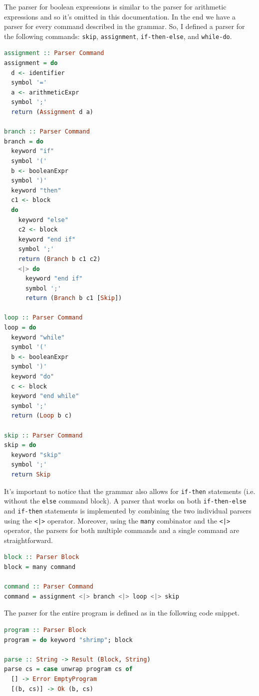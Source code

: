 \documentclass[12pt,a4paper]{article}
\begin{document}
The parser for boolean expressions is similar to the parser for arithmetic expressions and so it's omitted in this documentation. In the end we have a parser for every command described in the grammar.
So, I defined a parser for the following commands: \texttt{skip}, \texttt{assignment}, \texttt{if-then-else}, and \texttt{while-do}.
\begin{lstlisting}[language=Haskell, style=custom-style]
assignment :: Parser Command
assignment = do
  d <- identifier
  symbol '='
  a <- arithmeticExpr
  symbol ';'
  return (Assignment d a)

branch :: Parser Command
branch = do
  keyword "if"
  symbol '('
  b <- booleanExpr
  symbol ')'
  keyword "then"
  c1 <- block
  do
    keyword "else"
    c2 <- block
    keyword "end if"
    symbol ';'
    return (Branch b c1 c2)
    <|> do
      keyword "end if"
      symbol ';'
      return (Branch b c1 [Skip])

loop :: Parser Command
loop = do
  keyword "while"
  symbol '('
  b <- booleanExpr
  symbol ')'
  keyword "do"
  c <- block
  keyword "end while"
  symbol ';'
  return (Loop b c)

skip :: Parser Command
skip = do
  keyword "skip"
  symbol ';'
  return Skip
\end{lstlisting}
It's important to notice that the grammar also allows for \texttt{if-then} statements (i.e. without the \texttt{else} command block).
A parser that works on both \texttt{if-then-else} and \texttt{if-then} statements is implemented by combining the two individual parsers using the \texttt{<|>} operator.
Moreover, using the \texttt{many} combinator and the \texttt{<|>} operator, the parsers for both multiple commands and a single command are straightforward.
\begin{lstlisting}[language=Haskell, style=custom-style]
block :: Parser Block
block = many command

command :: Parser Command
command = assignment <|> branch <|> loop <|> skip
\end{lstlisting}
The parser for the entire program is defined as in the following code snippet.
\begin{lstlisting}[language=Haskell, style=custom-style]
program :: Parser Block
program = do keyword "shrimp"; block

parse :: String -> Result (Block, String)
parse cs = case unwrap program cs of
  [] -> Error EmptyProgram
  [(b, cs)] -> Ok (b, cs)
\end{lstlisting}
\end{document}
